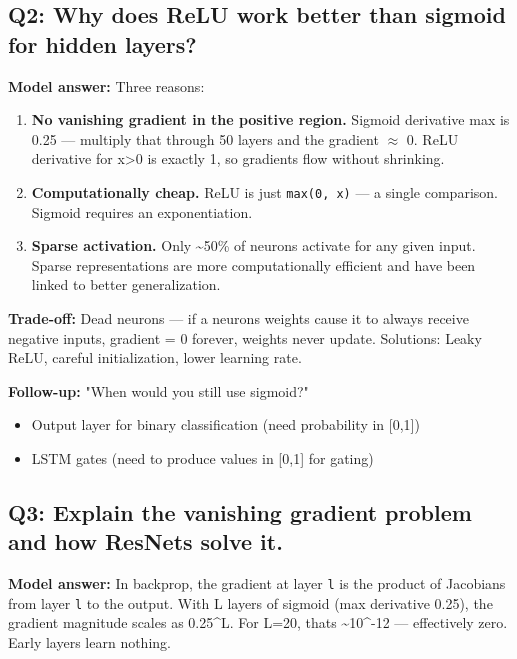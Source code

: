 \documentclass[11pt]{article}
\providecommand{\tightlist}{\setlength{\itemsep}{1pt}\setlength{\parskip}{0pt}}
\begin{document}
\subsection{Q2: Why does ReLU work better than sigmoid for hidden layers?}\label{q2-why-does-relu-work-better-than-sigmoid-for-hidden-layers}

\textbf{Model answer:}
Three reasons:

\begin{enumerate}
\def\labelenumi{\arabic{enumi}.}
\item
  \textbf{No vanishing gradient in the positive region.} Sigmoid derivative max is 0.25 --- multiply that through 50 layers and the gradient \(\approx\) 0. ReLU derivative for x\textgreater0 is exactly 1, so gradients flow without shrinking.
\item
  \textbf{Computationally cheap.} ReLU is just \texttt{max(0,\ x)} --- a single comparison. Sigmoid requires an exponentiation.
\item
  \textbf{Sparse activation.} Only \textasciitilde50\% of neurons activate for any given input. Sparse representations are more computationally efficient and have been linked to better generalization.
\end{enumerate}

\textbf{Trade-off:} Dead neurons --- if a neuron\textquotesingle s weights cause it to always receive negative inputs, gradient = 0 forever, weights never update. Solutions: Leaky ReLU, careful initialization, lower learning rate.

\textbf{Follow-up:} "When would you still use sigmoid?"

\begin{itemize}
\tightlist
\item
  Output layer for binary classification (need probability in {[}0,1{]})
\item
  LSTM gates (need to produce values in {[}0,1{]} for gating)
\end{itemize}

\subsection{Q3: Explain the vanishing gradient problem and how ResNets solve it.}\label{q3-explain-the-vanishing-gradient-problem-and-how-resnets-solve-it}

\textbf{Model answer:}
In backprop, the gradient at layer \texttt{l} is the product of Jacobians from layer \texttt{l} to the output. With L layers of sigmoid (max derivative 0.25), the gradient magnitude scales as 0.25\^{}L. For L=20, that\textquotesingle s \textasciitilde10\^{}-12 --- effectively zero. Early layers learn nothing.
\end{document}
